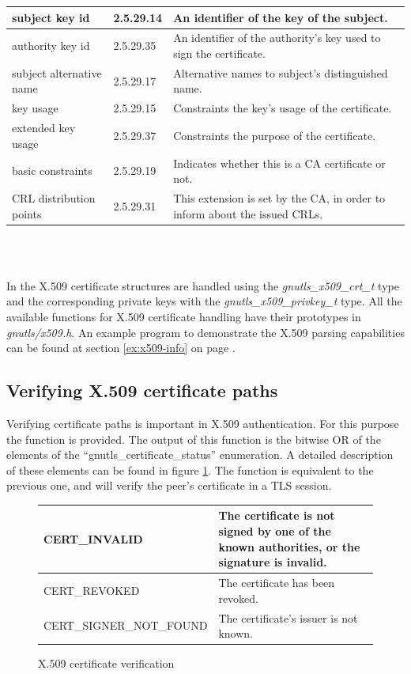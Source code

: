 \label{fig:x509_ext}
\begin{tabular}{|l|l|p{6cm}|}
\hline
subject key id & 2.5.29.14 & An identifier of the key of the subject.
\\
\hline
authority key id & 2.5.29.35 & An identifier of the authority's key used to sign the certificate.
\\
\hline
subject alternative name & 2.5.29.17 & Alternative names to subject's distinguished name.
\\
\hline
key usage & 2.5.29.15 & Constraints the key's usage of the certificate.
\\
\hline
extended key usage & 2.5.29.37 & Constraints the purpose of the certificate.
\\
\hline
basic constraints & 2.5.29.19 & Indicates whether this is a CA certificate or not.
\\
\hline
CRL distribution points & 2.5.29.31 & This extension is set by the CA, in order to inform about the issued CRLs.
\\
\hline
\end{tabular}
\\
\\
\par
In \gnutls{} the X.509 certificate structures are handled using the
\emph{gnutls\_x509\_crt\_t} type and the corresponding private keys with
the \emph{gnutls\_x509\_privkey\_t} type.
All the available functions for X.509 certificate handling have their 
prototypes in \emph{gnutls/x509.h}. An example program to demonstrate the 
X.509 parsing capabilities can be found at section \ref{ex:x509-info} on 
page \pageref{ex:x509-info}.

\subsection{Verifying X.509 certificate paths}
Verifying certificate paths is important 
in X.509 authentication. For this purpose the function
 is provided. The
output of this function is the bitwise OR of the elements of the
``gnutls\_certificate\_status'' enumeration. A detailed description of
these elements can be found in figure \ref{fig:verify}.
The function 
is equivalent to the previous one, and will verify the peer's certificate in a TLS session.

\begin{figure}[hbtp]
\begin{tabular}{|l|p{7cm}|}

\hline
CERT\_INVALID & The certificate is not signed by one of the known authorities, or
the signature is invalid.
\\
\hline
CERT\_REVOKED & The certificate has been revoked.
\\
\hline
CERT\_SIGNER\_NOT\_FOUND & The certificate's issuer is not known.
\\
\hline
\end{tabular}
\caption{X.509 certificate verification}
\label{fig:verify}
\end{figure}

